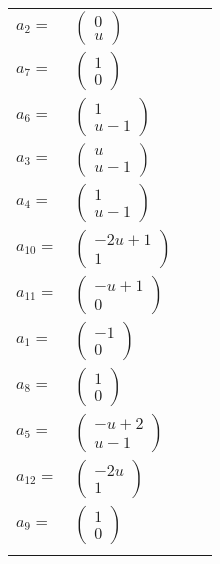 \documentclass[1p]{elsarticle_modified}
\theoremstyle{definition}
\begin{document}
\begin{tabular}{m{7pt} m{180pt} m{7pt} m{180pt} }
\flushright $a_{2}=$&$\begin{pmatrix}0\\u\end{pmatrix}$ \\
\flushright $a_{7}=$&$\begin{pmatrix}1\\0\end{pmatrix}$ \\
\flushright $a_{6}=$&$\begin{pmatrix}1\\u-1\end{pmatrix}$ \\
\flushright $a_{3}=$&$\begin{pmatrix}u\\u-1\end{pmatrix}$ \\
\flushright $a_{4}=$&$\begin{pmatrix}1\\u-1\end{pmatrix}$ \\
\flushright $a_{10}=$&$\begin{pmatrix}-2 u+1\\1\end{pmatrix}$ \\
\flushright $a_{11}=$&$\begin{pmatrix}- u+1\\0\end{pmatrix}$ \\
\flushright $a_{1}=$&$\begin{pmatrix}-1\\0\end{pmatrix}$ \\
\flushright $a_{8}=$&$\begin{pmatrix}1\\0\end{pmatrix}$ \\
\flushright $a_{5}=$&$\begin{pmatrix}- u+2\\u-1\end{pmatrix}$ \\
\flushright $a_{12}=$&$\begin{pmatrix}-2 u\\1\end{pmatrix}$ \\
\flushright $a_{9}=$&$\begin{pmatrix}1\\0\end{pmatrix}$\\&\end{tabular}
\end{document}
